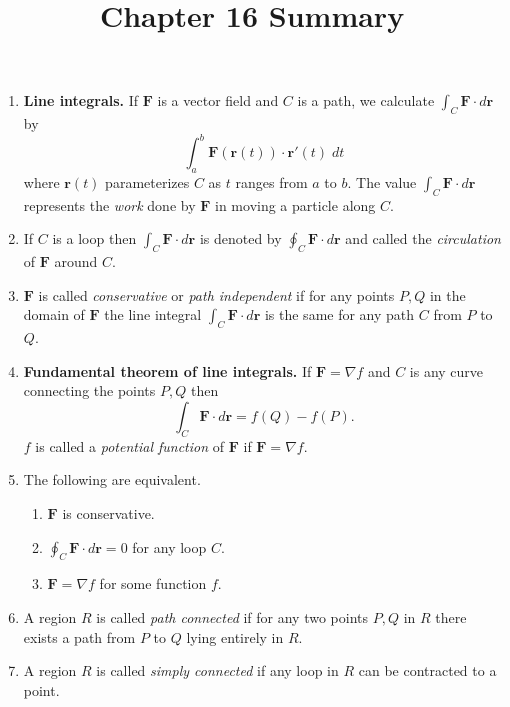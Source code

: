 \documentclass[12pt]{article}
\title{Chapter 16 Summary}
\author{}\date{}
\begin{document}
\maketitle
\thispagestyle{empty}

\begin{enumerate}
\item{\bf Line integrals.}
If $\mathbold{F}$ is a vector field and
$C$ is a path, we calculate $\int_C\mathbold{F}\cdot d\mathbold{r}$ by
\[\int_a^b\mathbold{F}\left(\mathbold{r}\left(t\right)\right)
\cdot\mathbold{r}'\left(t\right)\;dt\]
where $\mathbold{r}\left(t\right)$ parameterizes $C$
as $t$ ranges from $a$ to $b$.
The value $\int_C\mathbold{F}\cdot d\mathbold{r}$ represents
the {\em work} done by $\mathbold{F}$ in moving a particle along $C$.

\item If $C$ is a loop then
$\int_C\mathbold{F}\cdot d\mathbold{r}$
is denoted by
$\oint_C\mathbold{F}\cdot d\mathbold{r}$ and called the
{\em circulation} of $\mathbold{F}$ around $C$.

\item $\mathbold{F}$ is called {\em conservative} or {\em
path independent} if for any points $P,Q$ in the domain of $\mathbold{F}$
the line integral
$\int_C\mathbold{F}\cdot d\mathbold{r}$ is the same for any
path $C$ from $P$ to $Q$.

\item{\bf Fundamental theorem of line integrals.}
If $\mathbold{F}=\nabla f$ and $C$ is any curve
connecting the points $P,Q$ then
\[\int_C\mathbold{F}\cdot d\mathbold{r}=f\left(Q\right)-f\left(P\right).\]
$f$ is called a {\em potential function}
of $\mathbold{F}$ if $\mathbold{F}=\nabla f$.

\item The following are equivalent.
\begin{enumerate}
\item $\mathbold{F}$ is conservative.
\item $\oint_C\mathbold{F}\cdot d\mathbold{r}=0$
for any loop $C$.
\item $\mathbold{F}=\nabla f$ for some function $f$.
\end{enumerate}

\item A region $R$ is called {\em path connected}
if for any two points $P,Q$ in $R$ there exists
a path from $P$ to $Q$ lying entirely in $R$.

\item A region $R$ is called {\em simply connected}
if any loop in $R$ can be contracted to a point.


\end{enumerate}
\end{document}
